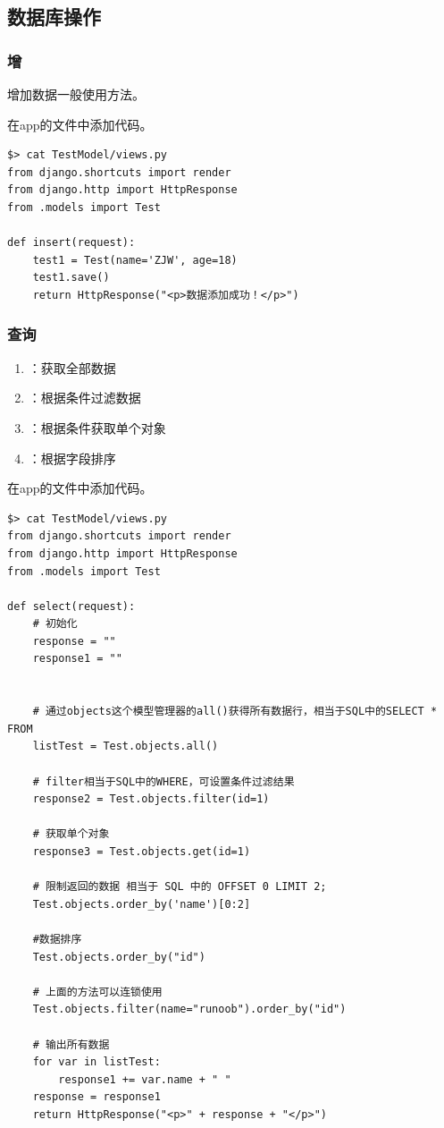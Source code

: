 \subsection{数据库操作}
\subsubsection{增}

增加数据一般使用方法。

在app的文件中添加代码。
\begin{lstlisting}[style=demostyle,numbers=none]
$> cat TestModel/views.py
from django.shortcuts import render
from django.http import HttpResponse
from .models import Test

def insert(request):
    test1 = Test(name='ZJW', age=18)
    test1.save()
    return HttpResponse("<p>数据添加成功！</p>")
\end{lstlisting}

\subsubsection{查询}

\begin{enumerate}
    \item {}：获取全部数据
    \item {}：根据条件过滤数据
    \item {}：根据条件获取单个对象
    \item {}：根据字段排序
\end{enumerate}

在app的文件中添加代码。
\begin{lstlisting}[style=demostyle,numbers=none]
$> cat TestModel/views.py
from django.shortcuts import render
from django.http import HttpResponse
from .models import Test

def select(request):
    # 初始化
    response = ""
    response1 = ""


    # 通过objects这个模型管理器的all()获得所有数据行，相当于SQL中的SELECT * FROM
    listTest = Test.objects.all()
        
    # filter相当于SQL中的WHERE，可设置条件过滤结果
    response2 = Test.objects.filter(id=1) 

    # 获取单个对象
    response3 = Test.objects.get(id=1) 

    # 限制返回的数据 相当于 SQL 中的 OFFSET 0 LIMIT 2;
    Test.objects.order_by('name')[0:2]

    #数据排序
    Test.objects.order_by("id")

    # 上面的方法可以连锁使用
    Test.objects.filter(name="runoob").order_by("id")

    # 输出所有数据
    for var in listTest:
        response1 += var.name + " "
    response = response1
    return HttpResponse("<p>" + response + "</p>")
\end{lstlisting}

